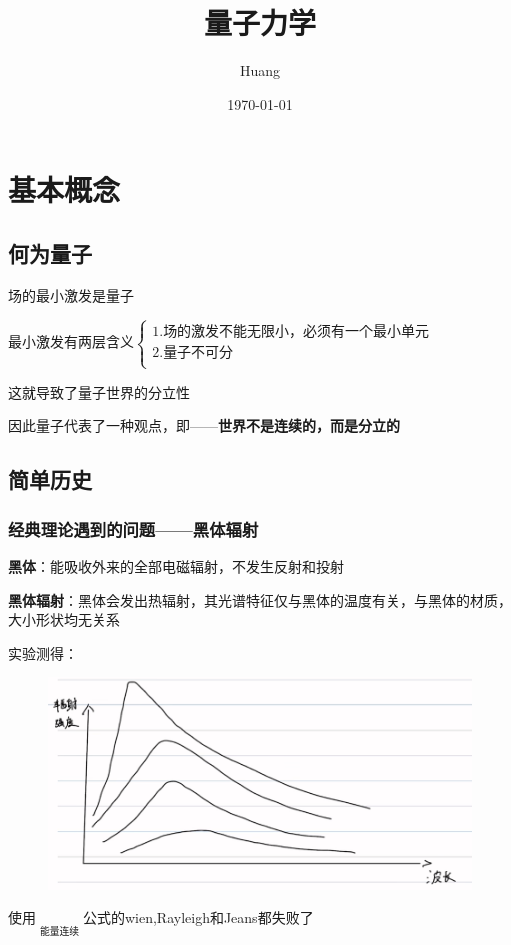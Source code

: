 \documentclass[lang=cn,10pt]{elegantbook}
\title{量子力学}
\author{Huang}
\date{\today}
\begin{document}
	
	\maketitle
	\frontmatter
	
	\tableofcontents
	
	\mainmatter
\chapter{基本概念}
\section{何为量子}

场的最小激发是量子

最小激发有两层含义$\begin{cases}
	1.\text{场的激发不能无限小，必须有一个最小单元}\\
	2.\text{量子不可分}\\
\end{cases}$

这就导致了量子世界的分立性

因此量子代表了一种观点，即——\textbf{世界不是连续的，而是分立的}
\section{简单历史}
\subsection{经典理论遇到的问题——黑体辐射}

\textbf{黑体}：能吸收外来的全部电磁辐射，不发生反射和投射

\textbf{黑体辐射}：黑体会发出热辐射，其光谱特征仅与黑体的温度有关，与黑体的材质，大小形状均无关系

实验测得：

\begin{figure}[H]
	\centering
	\includegraphics[width=0.5\linewidth]{figure/screenshot001}
\end{figure}

使用$\mathop {\underbrace{\text{经典理论}}} \limits_{\text{能量连续}}$公式的wien,Rayleigh和Jeans都失败了
\end{document}
